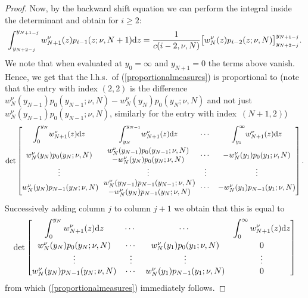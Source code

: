 \begin{proof}
Now, by the backward shift equation we can perform the integral inside the determinant and obtain for $i\ge 2$:
\begin{gather*}
\int_{y_{N+2-j}}^{y_{N+1-j}}w_{N+1}^{\nu}(z)p_{i-1} (z;\nu,N+1 ){\rm d}z=\frac{1}{c(i-2,\nu,N)}\big[w_{N}^{\nu}(z)p_{i-2}(z;\nu, N)\big]^{y_{N+1-j}}_{y_{N+2-j}}.
\end{gather*}
We note that when evaluated at $y_0=\infty$ and $y_{N+1}=0$ the terms above vanish. Hence, we get that the l.h.s.\ of (\ref{proportionalmeasures}) is proportional to (note that the entry with index $(2,2)$ is the difference $w_N^{\nu}(y_{N-1})p_0(y_{N-1};\nu, N)-w_N^{\nu}(y_N)p_0(y_N;\nu, N)$ and not just $w_N^{\nu}(y_{N-1})p_0(y_{N-1};\nu, N)$, similarly for the entry with index~$(N+1,2)$)
\begin{gather*}
\det\begin{bmatrix}
\displaystyle \int_{0}^{y_N}\!w_{N+1}^{\nu}(z){\rm d}z &\displaystyle \int_{y_N}^{y_{N-1}}\!w_{N+1}^{\nu}(z){\rm d}z &\cdots &\displaystyle \int_{y_1}^{\infty}\!w_{N+1}^{\nu}(z){\rm d}z\vspace{1mm}\\
 w_N^{\nu}(y_N)p_0(y_N;\nu, N) & \begin{matrix} w_N^{\nu}(y_{N-1})p_0(y_{N-1};\nu, N)\\ -w_N^{\nu}(y_N)p_0(y_N;\nu, N)\end{matrix} &\cdots & -w_N^{\nu}(y_1)p_0(y_1;\nu, N)\\
\vdots &\vdots &\vdots &\vdots\\
 w_N^{\nu}(y_N)p_{N-1}(y_N;\nu, N)\!\! & \begin{matrix} w_N^{\nu}(y_{N-1})p_{N-1}(y_{N-1};\nu, N)\\ -w_N^{\nu}(y_N)p_{N-1}(y_N;\nu, N)\end{matrix}\!\! &\cdots & -w_N^{\nu}(y_1)p_{N-1}(y_1;\nu, N)
\end{bmatrix}.
\end{gather*}
Successively adding column $j$ to column $j+1$ we obtain that this is equal to
\begin{gather*}
\det\begin{bmatrix}
\displaystyle \int_{0}^{y_N}w_{N+1}^{\nu}(z){\rm d}z & \cdots\ &\cdots \ &\displaystyle \int_{0}^{\infty}w_{N+1}^{\nu}(z){\rm d}z\vspace{1mm}\\
 w_N^{\nu}(y_N)p_0(y_N;\nu, N) &\cdots & w_N^{\nu}(y_1)p_{0}(y_1;\nu, N) & 0\\
\vdots &\vdots &\vdots &\vdots\\
 w_N^{\nu}(y_N)p_{N-1}(y_N;\nu, N) & \cdots & w_N^{\nu}(y_1)p_{N-1}(y_1;\nu, N) & 0
\end{bmatrix}
\end{gather*}
from which (\ref{proportionalmeasures}) immediately follows.
\end{proof}

